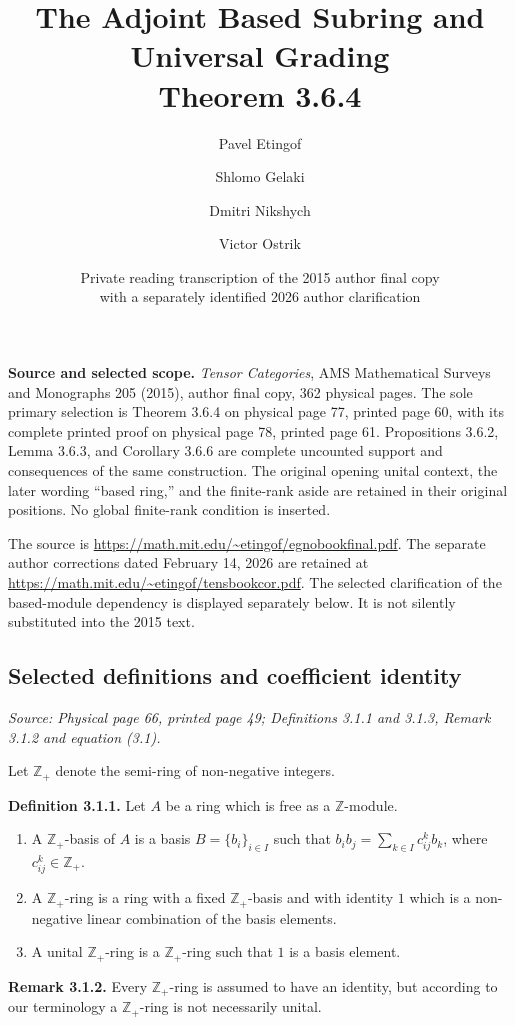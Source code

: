 \documentclass[11pt]{article}
\title{The Adjoint Based Subring and Universal Grading\\Theorem 3.6.4}
\author{Pavel Etingof \and Shlomo Gelaki \and Dmitri Nikshych \and Victor Ostrik}
\date{Private reading transcription of the 2015 author final copy\\with a separately identified 2026 author clarification}
\newcommand{\Z}{\mathbb{Z}}
\newcommand{\Zp}{\mathbb{Z}_+}
\newcommand{\sourceloc}[1]{\par\smallskip\noindent\textit{Source: #1.}\par\nopagebreak[4]\smallskip}
\begin{document}
\maketitle

\noindent\textbf{Source and selected scope.}
\emph{Tensor Categories}, AMS Mathematical Surveys and Monographs 205
(2015), author final copy, 362 physical pages. The sole primary selection
is Theorem 3.6.4 on physical page 77, printed page 60, with its complete
printed proof on physical page 78, printed page 61. Propositions 3.6.2,
Lemma 3.6.3, and Corollary 3.6.6 are complete uncounted support and
consequences of the same construction. The original opening unital
context, the later wording ``based ring,'' and the finite-rank aside
are retained in their original positions. No global finite-rank
condition is inserted.

\noindent The source is
\url{https://math.mit.edu/~etingof/egnobookfinal.pdf}.
The separate author corrections dated February 14, 2026 are retained at
\url{https://math.mit.edu/~etingof/tensbookcor.pdf}.
The selected clarification of the based-module dependency is displayed
separately below. It is not silently substituted into the 2015 text.

\subsection*{Selected definitions and coefficient identity}
\sourceloc{Physical page 66, printed page 49; Definitions 3.1.1 and 3.1.3, Remark 3.1.2 and equation (3.1)}
Let $\Zp$ denote the semi-ring of non-negative integers.

\noindent\textbf{Definition 3.1.1.}
Let $A$ be a ring which is free as a $\Z$-module.
\begin{enumerate}
\renewcommand{\labelenumi}{(\roman{enumi})}
\item A $\Zp$-basis of $A$ is a basis $B=\{b_i\}_{i\in I}$ such that
$b_i b_j=\sum_{k\in I}c^k_{ij}b_k$, where $c^k_{ij}\in\Zp$.
\item A $\Zp$-ring is a ring with a fixed $\Zp$-basis and with identity $1$
which is a non-negative linear combination of the basis elements.
\item A unital $\Zp$-ring is a $\Zp$-ring such that $1$ is a basis element.
\end{enumerate}

\noindent\textbf{Remark 3.1.2.}
Every $\Zp$-ring is assumed to have an identity, but according to our
terminology a $\Zp$-ring is not necessarily unital.
\end{document}
